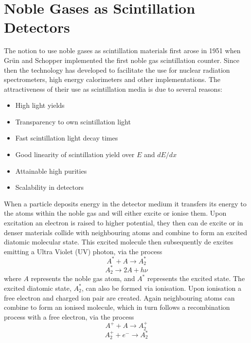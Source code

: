 \section{Noble Gases as Scintillation Detectors}
The notion to use noble gases as scintillation materials first arose in 1951 when Gr\"{u}n and Schopper implemented the first noble gas scintillation counter\cite{grunSchopper}. Since then the technology has developed to facilitate the use for nuclear radiation spectrometers, high energy calorimeters and other implementations. The attractiveness of their use as scintillation media is due to several reasons:
\begin{itemize}
	\item High light yields
	\item Transparency to own scintillation light
	\item Fast scintillation light decay times
	\item Good linearity of scintillation yield over $E$ and $dE/dx$
	\item Attainable high purities
	\item Scalability in detectors
\end{itemize}
When a particle deposits energy in the detector medium it transfers its energy to the atoms within the noble gas and will either excite or ionise them. Upon excitation an electron is raised to higher potential, they then can de excite or in denser materials collide with neighbouring atoms and combine to form an excited diatomic molecular state. This excited molecule then subsequently de excites emitting a Ultra Violet (UV) photon, via the process
\begin{equation}
	A^{*} + A \rightarrow A^{*}_{2}
\end{equation} 
\vspace{-5mm}
\begin{equation}
	A^{*}_{2} \rightarrow 2A + h\nu
\end{equation} 
where $A$ represents the noble gas atom, and $A^{*}$ represents the excited state.
The excited diatomic state, $A^{*}_{2}$, can also be formed via ionisation. Upon ionisation a free electron and charged ion pair are created. Again neighbouring atoms can combine to form an ionised molecule, which in turn follows a recombination process with a free electron, via the process
\begin{equation}
	A^{+} + A \rightarrow A^{+}_{2}
\end{equation} 
\vspace{-5mm}
\begin{equation}
	A^{+}_{2} + e^{-} \rightarrow A^{*}_{2}
\end{equation} 
